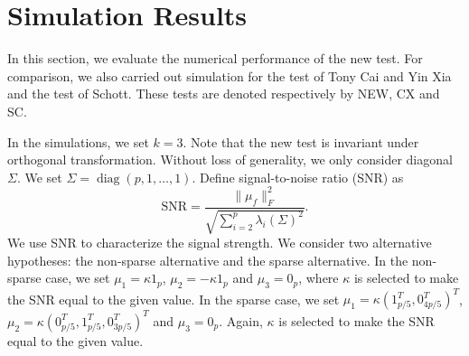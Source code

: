 \documentclass[review]{elsarticle}
\DeclareMathOperator{\mytr}{tr}
\DeclareMathOperator{\mydiag}{diag}
\theoremstyle{plain}
\theoremstyle{definition}
\theoremstyle{remark}
\begin{document}
\section{Simulation Results}

In this section, we evaluate the numerical performance of the new test. For comparison, we also carried out simulation for the test of Tony Cai and Yin Xia and the test of Schott. These tests are denoted respectively by NEW, CX and SC.

In the simulations, we set $k=3$.
Note that the new test is invariant under orthogonal transformation.
Without loss of generality, we only consider diagonal $\Sigma$.
We set $\Sigma=\mydiag(p,1,\ldots,1)$.
Define signal-to-noise ratio (SNR) as
$$
\textrm{SNR}=\frac{\|\mu_f\|_F^2}{\sqrt{\sum_{i=2}^{p}\lambda_i(\Sigma)^2}}.
$$
We use SNR to characterize the signal strength.
We consider two alternative hypotheses: the non-sparse alternative and the sparse alternative.
In the non-sparse case, we set $\mu_1=\kappa 1_p$, $\mu_2=-\kappa 1_p$ and $\mu_3=0_p$, where $\kappa$ is selected to make the SNR equal to the given value.
In the sparse case, we set $\mu_1=\kappa (1_{p/5}^T,0_{4p/5}^T)^T$, $\mu_2=\kappa (0_{p/5}^T, 1_{p/5}^T,0_{3p/5}^T)^T$ and $\mu_3=0_p$. Again, $\kappa$ is selected to make the SNR equal to the given value.

\end{document}

